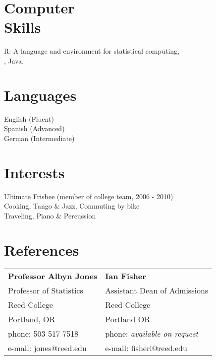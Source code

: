 \documentclass[margin,line]{resume}
\begin{document}
\begin{resume}
    \section{\mysidestyle Computer\\Skills}
 R: A language and environment for statistical computing, \\ \LaTeXe,  Java.
    \section{\mysidestyle Languages}
English (Fluent) \\
Spanish (Advanced)\\
German (Intermediate)   %

\newpage
    \section{\mysidestyle Interests} 

Ultimate Frisbee (member of college team, 2006 - 2010) \\
Cooking, Tango \& Jazz, Commuting by bike \\
Traveling, Piano \& Percussion \\







\section{\mysidestyle References} 

\begin{tabular}{@{}p{6cm}p{6cm}}
\textbf{Professor Albyn Jones}       &  \textbf{Ian Fisher}                   \\
Professor of Statistics                              & Assistant Dean of Admissions                       \\
Reed College                     &  Reed College                 \\
Portland, OR           &  Portland OR        \\
phone: 503 517 7518    &  phone: \textsl{available on request}     \\
e-mail: jones@reed.edu   &  e-mail: fisheri@reed.edu   \\
\end{tabular}


\end{resume}
\end{document}
